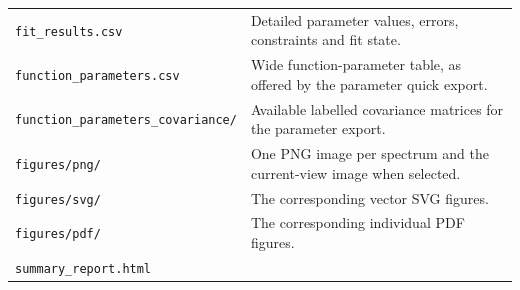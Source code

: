 \documentclass[
  10pt,
  a4paper,
  oneside]{scrreprt}
\begin{document}
\begin{longtable}[]{@{}ll@{}}
\begin{minipage}[t]{0.47\columnwidth}
\texttt{fit\_results.csv}\strut
\end{minipage} & \begin{minipage}[t]{0.47\columnwidth}\raggedright
Detailed parameter values, errors, constraints and fit state.\strut
\end{minipage}\tabularnewline
\begin{minipage}[t]{0.47\columnwidth}\raggedright
\texttt{function\_parameters.csv}\strut
\end{minipage} & \begin{minipage}[t]{0.47\columnwidth}\raggedright
Wide function-parameter table, as offered by the parameter quick
export.\strut
\end{minipage}\tabularnewline
\begin{minipage}[t]{0.47\columnwidth}\raggedright
\texttt{function\_parameters\_covariance/}\strut
\end{minipage} & \begin{minipage}[t]{0.47\columnwidth}\raggedright
Available labelled covariance matrices for the parameter export.\strut
\end{minipage}\tabularnewline
\begin{minipage}[t]{0.47\columnwidth}\raggedright
\texttt{figures/png/}\strut
\end{minipage} & \begin{minipage}[t]{0.47\columnwidth}\raggedright
One PNG image per spectrum and the current-view image when
selected.\strut
\end{minipage}\tabularnewline
\begin{minipage}[t]{0.47\columnwidth}\raggedright
\texttt{figures/svg/}\strut
\end{minipage} & \begin{minipage}[t]{0.47\columnwidth}\raggedright
The corresponding vector SVG figures.\strut
\end{minipage}\tabularnewline
\begin{minipage}[t]{0.47\columnwidth}\raggedright
\texttt{figures/pdf/}\strut
\end{minipage} & \begin{minipage}[t]{0.47\columnwidth}\raggedright
The corresponding individual PDF figures.\strut
\end{minipage}\tabularnewline
\begin{minipage}[t]{0.47\columnwidth}\raggedright
\texttt{summary\_report.html}\strut
\end{minipage} & \begin{minipage}[t]{0.47\columnwidth}\raggedright

\end{minipage}
\end{longtable}
\end{document}
